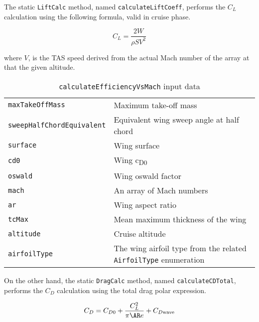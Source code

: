 The static \lstinline[language=Java]!LiftCalc! method, named \lstinline[language=Java]!calculateLiftCoeff!, performs the $C_{L}$ calculation using the following formula, valid in cruise phase.

\begin{equation}
C_L=\frac{2W}{\rho S V^2}
\label{eqn:Lift.Equation}
\end{equation}

\noindent
where $V$, is the TAS speed derived from the actual Mach number of the array at that the given altitude.

\begin{table}[b]
\begin{tabular}{p{7cm}p{7.5cm}}
\toprule
\lstinline[language=Java]!maxTakeOffMass! & Maximum take-off mass \\[0.1	cm]
\lstinline[language=Java]!sweepHalfChordEquivalent! & Equivalent wing sweep angle at half chord \\[0.1cm]
\lstinline[language=Java]!surface! & Wing surface \\[0.1cm]
\lstinline[language=Java]!cd0!	& Wing c\textsubscript{D0} \\[0.1cm]
\lstinline[language=Java]!oswald!	& Wing oswald factor \\[0.1cm]
\lstinline[language=Java]!mach!	& An array of Mach numbers \\[0.1cm]
\lstinline[language=Java]!ar!	& Wing aspect ratio \\[0.1cm]
\lstinline[language=Java]!tcMax! & Mean maximum thickness of the wing \\[0.1cm]
\lstinline[language=Java]!altitude! & Cruise altitude \\[0.1cm]
\lstinline[language=Java]!airfoilType! & The wing airfoil type from the related \lstinline[language=Java]!AirfoilType! enumeration \\
\bottomrule
\end{tabular}
\caption{ \lstinline[language=Java]!calculateEfficiencyVsMach! input data}
\label{table:Table1}
\end{table}

On the other hand, the static \lstinline[language=Java]!DragCalc! method, named \lstinline[language=Java]!calculateCDTotal!, performs the $C_{D}$ calculation using the total drag polar expression.

\begin{equation}
C_D=C_{D0}+\frac{C_L^2}{\pi \ensuremath{\AR} e}+C_{D\text{wave}}
\label{eqn:Drag.Total}
\end{equation}

